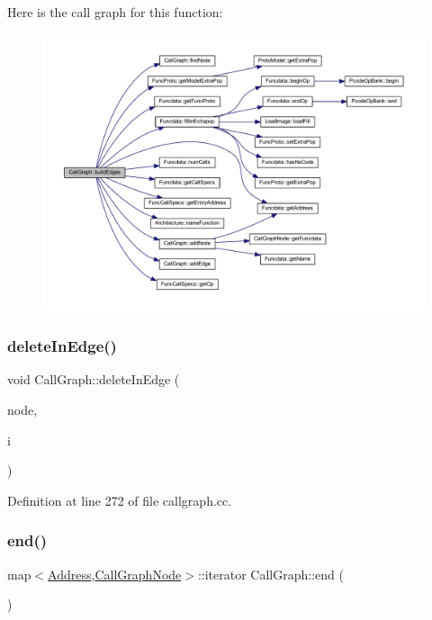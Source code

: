 Here is the call graph for this function\+:
\nopagebreak
\begin{figure}[H]
\begin{center}
\leavevmode
\includegraphics[width=350pt]{class_call_graph_a3cc813013efc9165d2f0496c9de488e4_cgraph}
\end{center}
\end{figure}
\mbox{\label{class_call_graph_a6433c96e380e121b3b4f200714996fe4}} 
\subsubsection{\texorpdfstring{deleteInEdge()}{deleteInEdge()}}
{\footnotesize\ttfamily void Call\+Graph\+::delete\+In\+Edge (\begin{DoxyParamCaption}\item[{\mbox{\hyperlink{class_call_graph_node}{Call\+Graph\+Node}} $\ast$}]{node,  }\item[{int4}]{i }\end{DoxyParamCaption})}



Definition at line 272 of file callgraph.\+cc.

\mbox{\label{class_call_graph_ad363d6774131c216fcb865ad114aadd9}} 
\subsubsection{\texorpdfstring{end()}{end()}}
{\footnotesize\ttfamily map$<$\mbox{\hyperlink{class_address}{Address}},\mbox{\hyperlink{class_call_graph_node}{Call\+Graph\+Node}}$>$\+::iterator Call\+Graph\+::end (\begin{DoxyParamCaption}\item[{void}]{ }\end{DoxyParamCaption})\hspace{0.3cm}{\ttfamily [inline]}}



